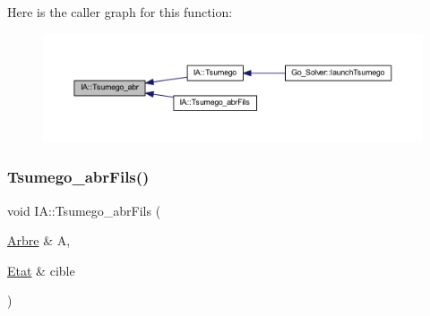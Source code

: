 Here is the caller graph for this function\+:
\nopagebreak
\begin{figure}[H]
\begin{center}
\leavevmode
\includegraphics[width=350pt]{class_i_a_af1f6e5abe41a2225b17ca319c1fc0e4e_icgraph}
\end{center}
\end{figure}
\mbox{\label{class_i_a_a6f616b7d3d9d39eef4780b7a03226260}} 
\subsubsection{\texorpdfstring{Tsumego\+\_\+abr\+Fils()}{Tsumego\_abrFils()}}
{\footnotesize\ttfamily void I\+A\+::\+Tsumego\+\_\+abr\+Fils (\begin{DoxyParamCaption}\item[{\hyperlink{class_arbre}{Arbre} \&}]{A,  }\item[{\hyperlink{class_etat}{Etat} \&}]{cible }\end{DoxyParamCaption})\hspace{0.3cm}{\ttfamily [static]}}

